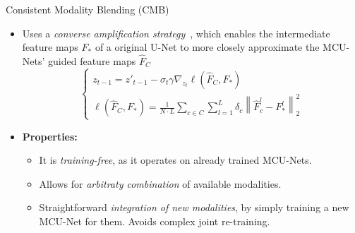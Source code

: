 \documentclass[pdf]{beamer}
\begin{document}
\begin{frame}{Consistent Modality Blending (CMB)}
    \begin{itemize}
        \item Uses a \textit{converse amplification strategy}~\cite{dhariwal2021diffusion}, which enables the intermediate feature maps $F_*$ of a original U-Net to more closely approximate the MCU-Nets' guided feature maps $\hat{F}_C$
        \[
        \begin{cases}
            z_{t-1} = z'_{t-1} - \sigma_t \gamma \nabla_{z_t} \ell(\hat{F}_C, F_*)
            \\
            \ell(\hat{F}_C, F_*) = \frac{1}{N \cdot L} \sum\limits_{c\in C} \sum\limits_{l=1}^{L} \delta_c \left\| \hat{F}_c^l - F_*^l \right\|_2^2
        \end{cases}
        \]
        \item \textbf{Properties:}
        \begin{itemize}
            \item It is \textit{training-free}, as it operates on already trained MCU-Nets.
            \item Allows for \textit{arbitraty combination} of available modalities.
            \item Straightforward \textit{integration of new modalities}, by simply training a new MCU-Net for them. Avoids complex joint re-training.
        \end{itemize}
        
    \end{itemize}
\end{frame}
\end{document}
